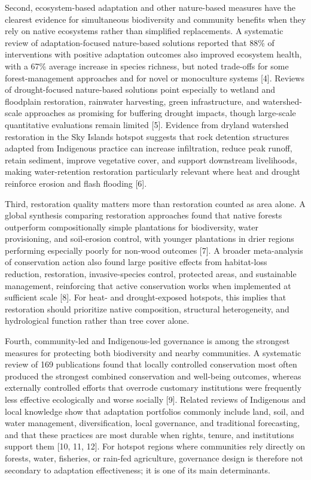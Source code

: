 \documentclass[11pt]{article}
\begin{document}
Second, ecosystem-based adaptation and other nature-based measures have the clearest evidence for simultaneous biodiversity and community benefits when they rely on native ecosystems rather than simplified replacements. A systematic review of adaptation-focused nature-based solutions reported that 88\% of interventions with positive adaptation outcomes also improved ecosystem health, with a 67\% average increase in species richness, but noted trade-offs for some forest-management approaches and for novel or monoculture systems [4]. Reviews of drought-focused nature-based solutions point especially to wetland and floodplain restoration, rainwater harvesting, green infrastructure, and watershed-scale approaches as promising for buffering drought impacts, though large-scale quantitative evaluations remain limited [5]. Evidence from dryland watershed restoration in the Sky Islands hotspot suggests that rock detention structures adapted from Indigenous practice can increase infiltration, reduce peak runoff, retain sediment, improve vegetative cover, and support downstream livelihoods, making water-retention restoration particularly relevant where heat and drought reinforce erosion and flash flooding [6].



Third, restoration quality matters more than restoration counted as area alone. A global synthesis comparing restoration approaches found that native forests outperform compositionally simple plantations for biodiversity, water provisioning, and soil-erosion control, with younger plantations in drier regions performing especially poorly for non-wood outcomes [7]. A broader meta-analysis of conservation action also found large positive effects from habitat-loss reduction, restoration, invasive-species control, protected areas, and sustainable management, reinforcing that active conservation works when implemented at sufficient scale [8]. For heat- and drought-exposed hotspots, this implies that restoration should prioritize native composition, structural heterogeneity, and hydrological function rather than tree cover alone.

Fourth, community-led and Indigenous-led governance is among the strongest measures for protecting both biodiversity and nearby communities. A systematic review of 169 publications found that locally controlled conservation most often produced the strongest combined conservation and well-being outcomes, whereas externally controlled efforts that overrode customary institutions were frequently less effective ecologically and worse socially [9]. Related reviews of Indigenous and local knowledge show that adaptation portfolios commonly include land, soil, and water management, diversification, local governance, and traditional forecasting, and that these practices are most durable when rights, tenure, and institutions support them [10, 11, 12]. For hotspot regions where communities rely directly on forests, water, fisheries, or rain-fed agriculture, governance design is therefore not secondary to adaptation effectiveness; it is one of its main determinants.
\end{document}
